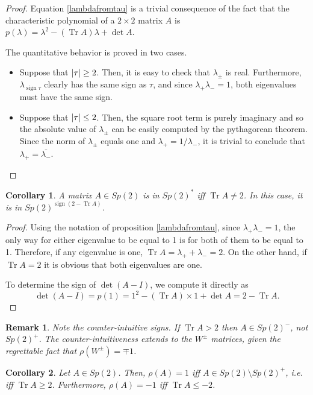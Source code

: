 \documentclass{article}
\newtheorem{corollary}{Corollary}
\newtheorem{remark}{Remark}
\theoremstyle{nonumberplain}
\newtheorem{proof}{Proof}
\DeclareMathOperator{\sign}{sign}
\DeclarePairedDelimiter{\abs}{\lvert}{\rvert}
\newcommand{\conj}[1]{\overline{#1}}
\DeclareMathOperator{\trace}{Tr}
\begin{document}
\begin{proof}
Equation \eqref{lambdafromtau} is a trivial consequence of the fact that the characteristic polynomial of a $2 \times 2$ matrix $A$ is $p(\lambda) = \lambda^2 - (\trace A) \lambda + \det A$.

The quantitative behavior is proved in two cases.
\begin{itemize}
\item Suppose that $\abs \tau \geq 2$. Then, it is easy to check that $\lambda_\pm$ is real. Furthermore, $\lambda_{\sign \tau}$ clearly has the same sign as $\tau$, and since $\lambda_+ \lambda_- = 1$, both eigenvalues must have the same sign.
\item Suppose that $\abs \tau \leq 2$. Then, the square root term is purely imaginary and so the absolute value of $\lambda_\pm$ can be easily computed by the pythagorean theorem. Since the norm of $\lambda_\pm$ equals one and $\lambda_+ = 1/\lambda_-$, it is trivial to conclude that $\lambda_+ = \conj{\lambda_-}$.
\end{itemize}
\end{proof}

\begin{corollary}\label{sp2sgn}
A matrix $A \in Sp(2)$ is in $Sp(2)^*$ iff $\trace A \neq 2$. In this case, it is in $Sp(2)^{\sign(2 - \trace A)}$.
\end{corollary}

\begin{proof}
Using the notation of proposition \ref{lambdafromtau}, since $\lambda_+ \lambda_- = 1$, the only way for either eigenvalue to be equal to 1 is for both of them to be equal to 1. Therefore, if any eigenvalue is one, $\trace A = \lambda_+ + \lambda_- = 2$. On the other hand, if $\trace A = 2$ it is obvious that both eigenvalues are one.

To determine the sign of $\det(A-I)$, we compute it directly as
\begin{equation}
\det(A-I) = p(1) = 1^2 - (\trace A) \times 1 + \det A = 2 - \trace A.
\end{equation}
\end{proof}

\begin{remark}
Note the counter-intuitive signs. If $\trace A > 2$ then $A \in Sp(2)^-$, not $Sp(2)^+$. The counter-intuitiveness extends to the $W^\pm$ matrices, given the regrettable fact that $\rho(W^\pm) = \mp 1$.
\end{remark}

\begin{corollary}\label{sp2pm}
Let $A \in Sp(2)$. Then, $\rho(A) = 1$ iff $A \in Sp(2) \setminus Sp(2)^+$, i.e. iff $\trace A \geq 2$. Furthermore, $\rho(A) = -1$ iff $\trace A \leq -2$.
\end{corollary}
\end{document}
